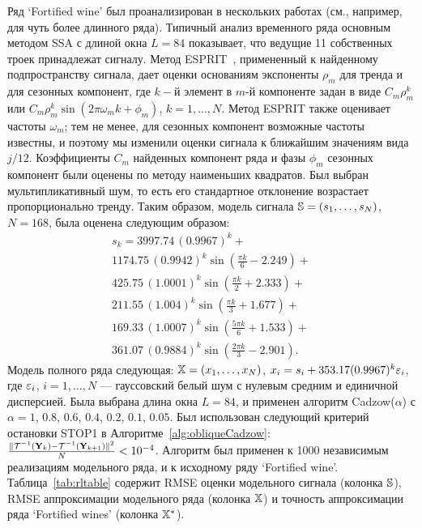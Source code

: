 \documentclass[12pt, specialist, subf,href,colorlinks=true,substylefile = spbu.rtx]{disser}
\theoremstyle{remark}
\theoremstyle{definition}
\begin{document}
Ряд `Fortified wine' был проанализирован в нескольких работах (см., например, \cite{Golyandina.etal2015} для чуть более длинного ряда). Типичный анализ временного ряда основным методом SSA с длиной окна $L=84$ показывает, что ведущие 11 собственных троек
принадлежат сигналу. Метод ESPRIT~\cite{Roy.Kailath1989,Golyandina.Zhigljavsky2012}, примененный к найденному подпространству сигнала, дает оценки основаниям экспоненты $\rho_m$ для тренда и для сезонных компонент, где $k-$й элемент в $m$-й компоненте задан в виде $C_m \rho_m^k$ или $C_m \rho_m^k \sin(2\pi\omega_m k +\phi_m)$, $k=1,\ldots,N$. Метод ESPRIT также оценивает частоты $\omega_m$; тем не менее, для сезонных компонент возможные частоты известны, и поэтому мы изменили оценки сигнала к ближайшим значениям вида $j/12$. Коэффициенты $C_m$ найденных компонент ряда и фазы $\phi_m$ сезонных компонент были оценены по методу наименьших квадратов. Был выбран мультипликативный шум, то есть его стандартное отклонение возрастает пропорционально тренду.
Таким образом, модель сигнала $\mathbb{S} = (s_{1}, \ldots, s_N)$, $N=168$, была оценена следующим образом:
%
%
\begin{multline*}
s_{k} = 3997.74\, (0.9967)^k + \\
1174.75\, (0.9942)^k \sin(\frac{\pi k}{6} - 2.249) + \\
425.75\, (1.0001)^k \sin(\frac{\pi k}{2} + 2.333) + \\
211.55\, (1.004)^k \sin(\frac{\pi k}{3} + 1.677) + \\
169.33\, (1.0007)^k \sin(\frac{5 \pi k}{6} + 1.533) + \\
361.07\, (0.9884)^k \sin(\frac{2 \pi k}{3} - 2.901).
\end{multline*}
Модель полного ряда следующая: $\mathbb{X}=(x_1,\ldots,x_N)$, $x_i=s_i + 353.17 (0.9967)^k \varepsilon_i$,
где  $\varepsilon_i$, $i=1,\ldots,N$ --- гауссовский белый шум с нулевым средним и единичной дисперсией.
Была выбрана длина окна $L=84$, и применен алгоритм Cadzow($\alpha$) с $\alpha=1$, $0.8$, $0.6$, $0.4$, $0.2$, $0.1$, $0.05$.
Был использован следующий критерий остановки STOP1 в Алгоритме~\ref{alg:obliqueCadzow}:
$\frac{\|\mathcal{T}^{-1}(\mathbf{Y}_k) - \mathcal{T}^{-1}(\mathbf{Y}_{k + 1})\|^2}{N} <10^{-4}$.
Алгоритм был применен к 1000 независимым реализациям модельного ряда, и к исходному ряду `Fortified wine'.
Таблица~\ref{tab:rltable} содержит RMSE оценки модельного сигнала (колонка $\mathbb{S}$),
RMSE аппроксимации модельного ряда (колонка $\mathbb{X}$) и точность аппроксимации ряда
`Fortified wines' (колонка $\mathbb{X}^*$).
\end{document}
